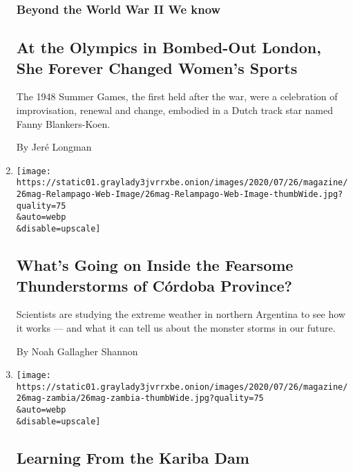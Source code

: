 \begin{enumerate}
  \hypertarget{beyond-the-world-war-ii-we-know}{%
  \subsubsection{Beyond the World War II We
  know}\label{beyond-the-world-war-ii-we-know}}

  \hypertarget{at-the-olympics-in-bombed-out-london-she-forever-changed-womens-sports}{%
  \subsection{At the Olympics in Bombed-Out London, She Forever Changed
  Women's
  Sports}\label{at-the-olympics-in-bombed-out-london-she-forever-changed-womens-sports}}

  The 1948 Summer Games, the first held after the war, were a
  celebration of improvisation, renewal and change, embodied in a Dutch
  track star named Fanny Blankers-Koen.

  By Jeré Longman
\item
  \href{/interactive/2020/07/22/magazine/worst-storms-argentina.html}{}

  \texttt{[image: https://static01.graylady3jvrrxbe.onion/images/2020/07/26/magazine/26mag-Relampago-Web-Image/26mag-Relampago-Web-Image-thumbWide.jpg?quality=75\\\&auto=webp\\\&disable=upscale]}

  \hypertarget{whats-going-on-inside-the-fearsome-thunderstorms-of-cuxf3rdoba-province}{%
  \subsection{What's Going on Inside the Fearsome Thunderstorms of
  Córdoba
  Province?}\label{whats-going-on-inside-the-fearsome-thunderstorms-of-cuxf3rdoba-province}}

  Scientists are studying the extreme weather in northern Argentina to
  see how it works --- and what it can tell us about the monster storms
  in our future.

  By Noah Gallagher Shannon
\item
  \href{/interactive/2020/07/22/magazine/zambia-kariba-dam.html}{}

  \texttt{[image: https://static01.graylady3jvrrxbe.onion/images/2020/07/26/magazine/26mag-zambia/26mag-zambia-thumbWide.jpg?quality=75\\\&auto=webp\\\&disable=upscale]}

  \hypertarget{learning-from-the-kariba-dam}{%
  \subsection{Learning From the Kariba
  Dam}\label{learning-from-the-kariba-dam}}


\end{enumerate}
